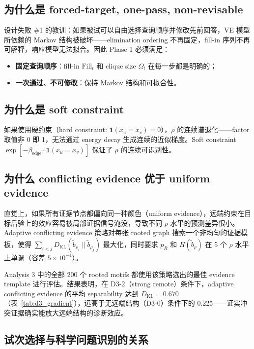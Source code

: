 \documentclass[11pt,a4paper]{ctexart}
\begin{document}
\subsection{为什么是 forced-target, one-pass, non-revisable}

设计失败 \#1 的教训：如果被试可以自由选择查询顺序并修改先前回答，VE 模型所依赖的 Markov 结构被破坏——elimination ordering 不再固定，fill-in 序列不再可解释，响应模型无法拟合。因此 Phase 1 必须满足：
\begin{itemize}
    \item \textbf{固定查询顺序}：fill-in $\mathrm{Fill}_t$ 和 clique size $\Omega_t$ 在每一步都是明确的；
    \item \textbf{一次通过、不可修改}：保持 Markov 结构和可拟合性。
\end{itemize}

\subsection{为什么是 soft constraint}

如果使用硬约束（hard constraint: $\mathbf{1}(x_u=x_v)=0$），$\rho$ 的连续谱退化——factor 取值非 0 即 1，无法通过 energy decay 生成连续的近似梯度。Soft constraint $\exp[-\beta_\mathrm{edge}\cdot\mathbf{1}(x_u=x_v)]$ 保证了 $\rho$ 的连续可识别性。

\subsection{为什么 conflicting evidence 优于 uniform evidence}

直觉上，如果所有证据节点都偏向同一种颜色（uniform evidence），远端约束在目标后验上的效应容易被局部证据信号淹没，导致不同 $\rho$ 水平的预测差异很小。Adaptive conflicting evidence 策略对每张 rooted graph 搜索一个非均匀的证据模板，使得
$\sum_{i<j} D_\mathrm{KL}(\tilde{b}_{\rho_i}\|\tilde{b}_{\rho_j})$
最大化，同时要求 $p_R$ 和 $H(\tilde{b}_\rho)$ 在 5 个 $\rho$ 水平上单调（容差 $5\times 10^{-4}$）。

Analysis 3 中的全部 200 个 rooted motifs 都使用该策略选出的最佳 evidence template 进行评估。结果表明，在 D3-2（strong remote）条件下，adaptive conflicting evidence 的平均 separability 达到 $D_\mathrm{KL}=0.670$（表~\ref{tab:d3_gradient}），远高于无远端结构（D3-0）条件下的 0.225——证实冲突证据确实能放大远端结构的诊断效应。

\subsection{试次选择与科学问题识别的关系}
\end{document}
